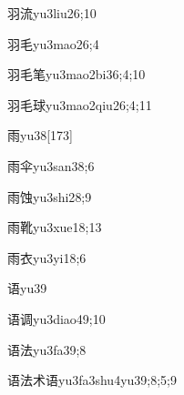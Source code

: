 \begin{verbete}{羽流}{yu3liu2}{6;10}
\end{verbete}

\begin{verbete}{羽毛}{yu3mao2}{6;4}
\end{verbete}

\begin{verbete}{羽毛笔}{yu3mao2bi3}{6;4;10}
\end{verbete}

\begin{verbete}{羽毛球}{yu3mao2qiu2}{6;4;11}
\end{verbete}

\begin{verbete}{雨}{yu3}{8}[173]
\end{verbete}

\begin{verbete}{雨伞}{yu3san3}{8;6}
\end{verbete}

\begin{verbete}{雨蚀}{yu3shi2}{8;9}
\end{verbete}

\begin{verbete}{雨靴}{yu3xue1}{8;13}
\end{verbete}

\begin{verbete}{雨衣}{yu3yi1}{8;6}
\end{verbete}

\begin{verbete}{语}{yu3}{9}
\end{verbete}

\begin{verbete}{语调}{yu3diao4}{9;10}
\end{verbete}

\begin{verbete}{语法}{yu3fa3}{9;8}
\end{verbete}

\begin{verbete}{语法术语}{yu3fa3shu4yu3}{9;8;5;9}
\end{verbete}

